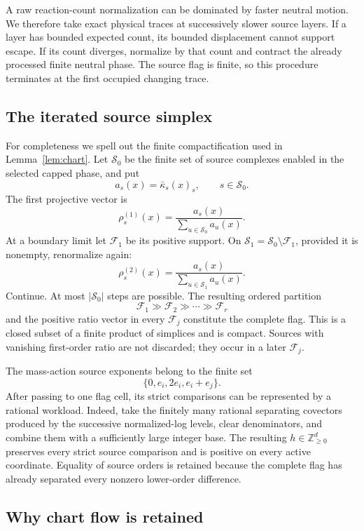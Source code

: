 \documentclass[11pt]{article}
\begin{document}
A raw reaction-count normalization can be dominated by faster neutral
motion.  We therefore take exact physical traces at successively slower
source layers.  If a layer has bounded expected count, its bounded
displacement cannot support escape.  If its count diverges, normalize by that
count and contract the already processed finite neutral phase.  The source
flag is finite, so this procedure terminates at the first occupied changing
trace.


\subsection{The iterated source simplex}

For completeness we spell out the finite compactification used in
Lemma~\ref{lem:chart}.  Let \(\mathcal S_0\) be the finite set of source
complexes enabled in the selected capped phase, and put
\[
 a_s(x)=\bar\kappa_s(x)_s,\qquad s\in\mathcal S_0.
\]
The first projective vector is
\[
 \rho^{(1)}_s(x)=\frac{a_s(x)}{\sum_{u\in\mathcal S_0}a_u(x)}.
\]
At a boundary limit let \(\mathcal F_1\) be its positive support.  On
\(\mathcal S_1=\mathcal S_0\setminus\mathcal F_1\), provided it is nonempty,
renormalize again:
\[
 \rho^{(2)}_s(x)=\frac{a_s(x)}{\sum_{u\in\mathcal S_1}a_u(x)}.
\]
Continue.  At most \(|\mathcal S_0|\) steps are possible.  The resulting
ordered partition
\[
 \mathcal F_1\gg\mathcal F_2\gg\cdots\gg\mathcal F_r
\]
and the positive ratio vector in every \(\mathcal F_j\) constitute the
complete flag.  This is a closed subset of a finite product of simplices and
is compact.  Sources with vanishing first-order ratio are not discarded; they
occur in a later \(\mathcal F_j\).

The mass-action source exponents belong to the finite set
\[
 \{0,e_i,2e_i,e_i+e_j\}.
\]
After passing to one flag cell, its strict comparisons can be represented by
a rational workload.  Indeed, take the finitely many rational separating
covectors produced by the successive normalized-log levels, clear
denominators, and combine them with a sufficiently large integer base.
The resulting \(h\in\mathbb Z_{\ge0}^d\) preserves every strict source
comparison and is positive on every active coordinate.  Equality of source
orders is retained because the complete flag has already separated every
nonzero lower-order difference.

\subsection{Why chart flow is retained}
\end{document}
